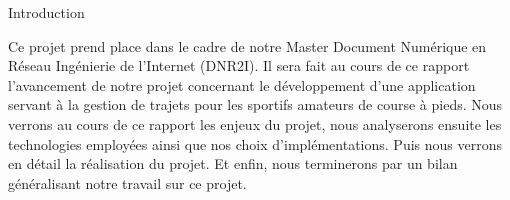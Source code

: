 {\Huge{Introduction}}

\vspace{2cm}
Ce projet prend place dans le cadre de notre Master Document Numérique en Réseau Ingénierie de l'Internet (DNR2I). Il sera fait au cours de ce rapport l'avancement de notre projet concernant le développement d'une application servant à la gestion de trajets pour les sportifs amateurs de course à pieds. Nous verrons au cours de ce rapport les enjeux du projet, nous analyserons ensuite les technologies employées ainsi que nos choix d'implémentations. Puis nous verrons en détail la réalisation du projet. Et enfin, nous terminerons par un bilan généralisant notre travail sur ce projet.